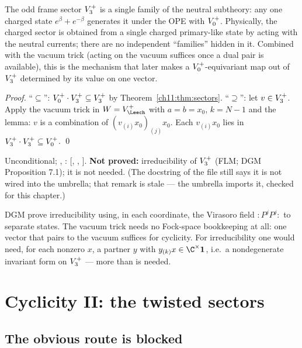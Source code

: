 \begin{physics}
The odd frame sector $V_3^{+}$ is a single family of the neutral subtheory: any one charged state $e^\beta+e^{-\beta}$ generates it under the OPE with $V_0^{+}$. Physically, the charged sector is obtained from a single charged primary-like state by acting with the neutral currents; there are no independent ``families'' hidden in it. Combined with the vacuum trick (acting on the vacuum suffices once a dual pair is available), this is the mechanism that later makes a $V_0^{+}$-equivariant map out of $V_3^{+}$ determined by its value on one vector.
\end{physics}
\emph{Proof.}  ``$\subseteq$'': $V_0^{+}\cdot V_3^{+}\subseteq V_3^{+}$ by
Theorem~\ref{ch11:thm:sectors}.  ``$\supseteq$'': let $v\in V_3^{+}$.  Apply the vacuum trick in
$W=V_\Leech^+$ with $a=b=x_0$, $k=N-1$ and the lemma: $v$ is a combination of $(v_{(i)}x_0)_{(j)}x_0$.
Each $v_{(i)}x_0$ lies in $V_3^{+}\cdot V_3^{+}\subseteq V_0^{+}$. \qed
\begin{status}Unconditional; , : [,
, ].  \textbf{Not proved:} irreducibility of $V_3^{+}$
(FLM; DGM Proposition 7.1); it is not needed.  (The docstring of the file still says it is not
wired into the  umbrella; that remark is stale --- the umbrella imports
it, checked for this chapter.)
\end{status}

\begin{remark}
DGM prove irreducibility using, in each coordinate, the Virasoro field $:\!P^jP^j\!:$ to separate
states.  The vacuum trick needs no Fock-space bookkeeping at all: one vector that pairs to the
vacuum suffices for cyclicity.  For irreducibility one would need, for each nonzero $x$, a partner
$y$ with $y_{(k)}x\in\C^\times\mathbf 1$, i.e.\ a nondegenerate invariant form on $V_3^{+}$ --- more
than is needed.
\end{remark}

\section{Cyclicity II: the twisted sectors}\label{ch11:sec:cyclictwisted}

\subsection{The obvious route is blocked}

